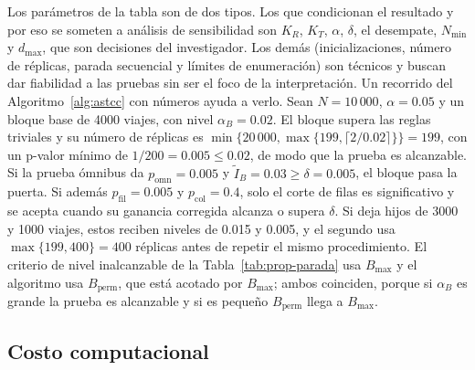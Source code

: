 Los parámetros de la tabla son de dos tipos. Los que condicionan el resultado y
por eso se someten a análisis de sensibilidad son $K_R$, $K_T$, $\alpha$, $\delta$,
el desempate, $N_{\min}$ y $d_{\max}$, que son decisiones del investigador. Los demás
(inicializaciones, número de réplicas, parada secuencial y límites de enumeración)
son técnicos y buscan dar fiabilidad a las pruebas sin ser el foco de la
interpretación. Un recorrido del Algoritmo~\ref{alg:astcc} con números ayuda a
verlo. Sean $N=10\,000$, $\alpha=0.05$ y un bloque base de 4000 viajes, con nivel
$\alpha_B=0.02$. El bloque supera las reglas triviales y su número de réplicas es
$\min\{20\,000,\max\{199,\lceil 2/0.02\rceil\}\}=199$, con un p-valor mínimo de
$1/200=0.005\le 0.02$, de modo que la prueba es alcanzable. Si la prueba ómnibus da
$p_{\mathrm{omn}}=0.005$ y $\tilde I_B=0.03\ge\delta=0.005$, el bloque pasa la
puerta. Si además $p_{\mathrm{fil}}=0.005$ y $p_{\mathrm{col}}=0.4$, solo el corte de
filas es significativo y se acepta cuando su ganancia corregida alcanza o supera $\delta$. Si
deja hijos de 3000 y 1000 viajes, estos reciben niveles de 0.015 y 0.005, y el segundo
usa $\max\{199,400\}=400$ réplicas antes de repetir el mismo procedimiento. El
criterio de nivel inalcanzable de la Tabla~\ref{tab:prop-parada} usa $B_{\max}$ y el
algoritmo usa $B_{\mathrm{perm}}$, que está acotado por $B_{\max}$; ambos coinciden,
porque si $\alpha_B$ es grande la prueba es alcanzable y si es pequeño
$B_{\mathrm{perm}}$ llega a $B_{\max}$.

\subsection{Costo computacional}


